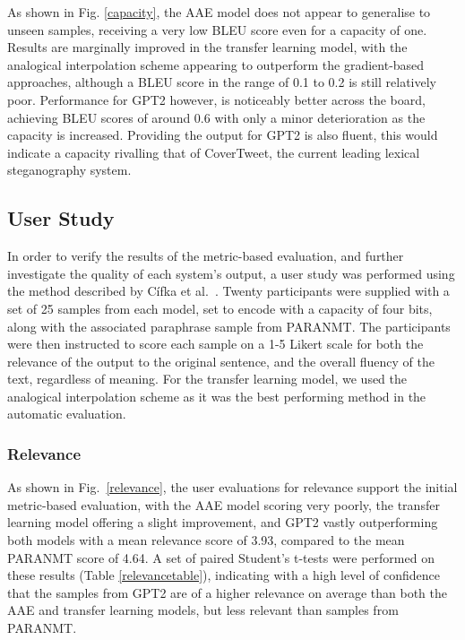 \documentclass[12pt,a4paper]{article}
\begin{document}
\noindent  As shown in Fig. \ref{capacity}, the AAE model does not appear to generalise to unseen samples, receiving a very low BLEU score even for a capacity of one. Results are marginally improved in the transfer learning model, with the analogical interpolation scheme appearing to outperform the gradient-based approaches, although a BLEU score in the range of 0.1 to 0.2 is still relatively poor. Performance for GPT2 however, is noticeably better across the board, achieving BLEU scores of around 0.6 with only a minor deterioration as the capacity is increased. Providing the output for GPT2 is also fluent, this would indicate a capacity rivalling that of CoverTweet, the current leading lexical steganography system. 



\subsection{User Study}

\noindent In order to verify the results of the metric-based evaluation, and further investigate the quality of each system's output, a user study was performed using the method described by C\'ifka et al.\ \citeyear{evalall}. Twenty participants were supplied with a set of 25 samples from each model, set to encode with a capacity of four bits, along with the associated paraphrase sample from P{\footnotesize ARA}NMT. The participants were then instructed to score each sample on a 1-5 Likert scale for both the relevance of the output to the original sentence, and the overall fluency of the text, regardless of meaning. For the transfer learning model, we used the analogical interpolation scheme as it was the best performing method in the automatic evaluation.

\subsubsection{Relevance}

\noindent As shown in Fig.\ \ref{relevance}, the user evaluations for relevance support the initial metric-based evaluation, with the AAE model scoring very poorly, the transfer learning model offering a slight improvement, and GPT2 vastly outperforming both models with a mean relevance score of 3.93, compared to the mean P{\footnotesize ARA}NMT score of 4.64. A set of paired Student's t-tests were performed on these results (Table \ref{relevancetable}), indicating with a high level of confidence that the samples from GPT2 are of a higher relevance on average than both the AAE and transfer learning models, but less relevant than samples from P{\footnotesize ARA}NMT.
\end{document}
